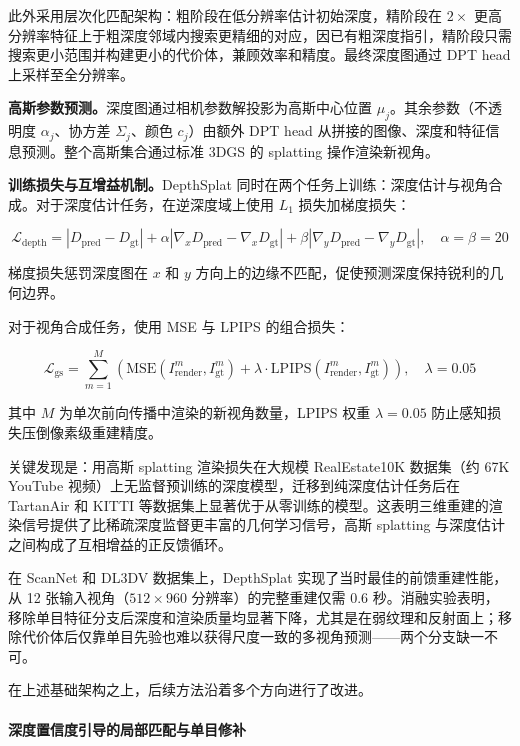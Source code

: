 此外采用层次化匹配架构：粗阶段在低分辨率估计初始深度，精阶段在 $2\times$ 更高分辨率特征上于粗深度邻域内搜索更精细的对应，因已有粗深度指引，精阶段只需搜索更小范围并构建更小的代价体，兼顾效率和精度。最终深度图通过 DPT head 上采样至全分辨率。

\textbf{高斯参数预测。}深度图通过相机参数解投影为高斯中心位置 $\mu_j$。其余参数（不透明度 $\alpha_j$、协方差 $\Sigma_j$、颜色 $c_j$）由额外 DPT head 从拼接的图像、深度和特征信息预测。整个高斯集合通过标准 3DGS 的 splatting 操作渲染新视角。

\textbf{训练损失与互增益机制。}DepthSplat 同时在两个任务上训练：深度估计与视角合成。对于深度估计任务，在逆深度域上使用 $L_1$ 损失加梯度损失：

\begin{equation}
\mathcal{L}_{\text{depth}} = |D_{\text{pred}} - D_{\text{gt}}| + \alpha |\nabla_x D_{\text{pred}} - \nabla_x D_{\text{gt}}| + \beta |\nabla_y D_{\text{pred}} - \nabla_y D_{\text{gt}}|, \quad \alpha=\beta=20
\end{equation}

梯度损失惩罚深度图在 $x$ 和 $y$ 方向上的边缘不匹配，促使预测深度保持锐利的几何边界。

对于视角合成任务，使用 MSE 与 LPIPS 的组合损失：

\begin{equation}
\mathcal{L}_{\text{gs}} = \sum_{m=1}^{M} \left(\text{MSE}(I^m_{\text{render}}, I^m_{\text{gt}}) + \lambda \cdot \text{LPIPS}(I^m_{\text{render}}, I^m_{\text{gt}})\right), \quad \lambda = 0.05
\end{equation}

其中 $M$ 为单次前向传播中渲染的新视角数量，LPIPS 权重 $\lambda=0.05$ 防止感知损失压倒像素级重建精度。

关键发现是：用高斯 splatting 渲染损失在大规模 RealEstate10K 数据集（约 67K YouTube 视频）上无监督预训练的深度模型，迁移到纯深度估计任务后在 TartanAir 和 KITTI 等数据集上显著优于从零训练的模型。这表明三维重建的渲染信号提供了比稀疏深度监督更丰富的几何学习信号，高斯 splatting 与深度估计之间构成了互相增益的正反馈循环。

在 ScanNet 和 DL3DV 数据集上，DepthSplat 实现了当时最佳的前馈重建性能，从 12 张输入视角（$512\times 960$ 分辨率）的完整重建仅需 0.6 秒。消融实验表明，移除单目特征分支后深度和渲染质量均显著下降，尤其是在弱纹理和反射面上；移除代价体后仅靠单目先验也难以获得尺度一致的多视角预测——两个分支缺一不可。

在上述基础架构之上，后续方法沿着多个方向进行了改进。

\paragraph{深度置信度引导的局部匹配与单目修补}

